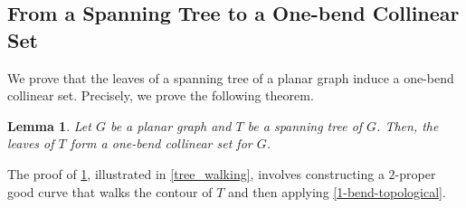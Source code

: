 \documentclass[a4paper,UKenglish,cleveref, autoref, thm-restate]{lipics-v2021}
\newtheorem{lem}{Lemma}
\begin{document}
\subsection{From a Spanning Tree to a One-bend Collinear Set}

We prove that the leaves of a spanning tree of a planar graph induce a one-bend collinear set. Precisely, we prove the following theorem.

\begin{lem} \label{spanning_tree_to_collinear_set}
  Let $G$ be a planar graph and $T$ be a spanning tree of $G$. Then, the leaves of $T$ form a one-bend collinear set for $G$.
\end{lem}

The proof of \cref{spanning_tree_to_collinear_set}, illustrated in \cref{tree_walking}, involves constructing a $2$-proper good curve that walks the contour of $T$ and then applying \cref{1-bend-topological}.
\end{document}
